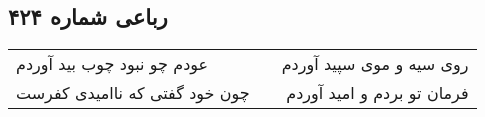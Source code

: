 \begin{center}
\section*{رباعی شماره ۴۲۴}
\label{sec:sh424}
\begin{longtable}{l p{0.5cm} r}
عودم چو نبود چوب بید آوردم
&&
روی سیه و موی سپید آوردم
\\
چون خود گفتی که ناامیدی کفرست
&&
فرمان تو بردم و امید آوردم
\\
\end{longtable}
\end{center}
